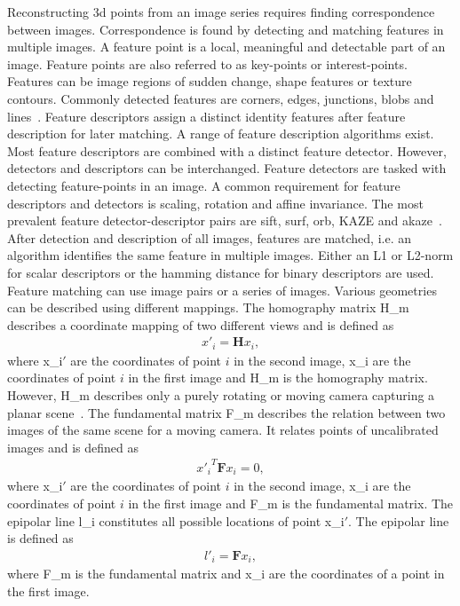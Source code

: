 Reconstructing \gls{3d} points from an image series requires finding correspondence between images. Correspondence is found by detecting and matching features in multiple images. A feature point is a local, meaningful and detectable part of an image. Feature points are also referred to as key-points or interest-points. Features can be image regions of sudden change, shape features or texture contours. Commonly detected features are corners, edges, junctions, blobs and lines~\cite{Tareen2018ABRISK}. Feature descriptors assign a distinct identity features after feature description for later matching. A range of feature description algorithms exist. Most feature descriptors are combined with a distinct feature detector. However, detectors and descriptors can be interchanged. Feature detectors are tasked with detecting feature-points in an image. A common requirement for feature descriptors and detectors is scaling, rotation and affine invariance. The most prevalent feature detector-descriptor pairs are \gls{sift}, \gls{surf}, \gls{orb}, KAZE and \gls{akaze}~\cite{Tareen2018ABRISK}.
After detection and description of all images, features are matched, i.e. an algorithm identifies the same feature in multiple images. Either an L1 or L2-norm for scalar descriptors or the hamming distance for binary descriptors are used. Feature matching can use image pairs or a series of images. Various geometries can be described using different mappings. The homography matrix \gls{H_m} describes a coordinate mapping of two different views and is defined as
\begin{align}
    x'_i = \textbf{H}x_i, \label{eq:homography_m}
\end{align}
where \gls{x_i}$'$ are the coordinates of point $i$ in the second image, \gls{x_i} are the coordinates of point $i$ in the first image and \gls{H_m} is the homography matrix. However, \gls{H_m} describes only a purely rotating or moving camera capturing a planar scene~\cite{schonberger2016structure}. The fundamental matrix \gls{F_m} describes the relation between two images of the same scene for a moving camera. It relates points of uncalibrated images and is defined as
\begin{align}
    {x'_i}^{T}\textbf{F}x_i = 0, \label{eq:fundamental_m}
\end{align}
where \gls{x_i}$'$ are the coordinates of point $i$ in the second image, \gls{x_i} are the coordinates of point $i$ in the first image and \gls{F_m} is the fundamental matrix. The epipolar line \gls{l_i} constitutes all possible locations of point \gls{x_i}$'$. The epipolar line is defined as
\begin{align}
    l'_i = \textbf{F}x_i, \label{eq:epipolar_l}
\end{align}
where \gls{F_m} is the fundamental matrix and \gls{x_i} are the coordinates of a point in the first image.

